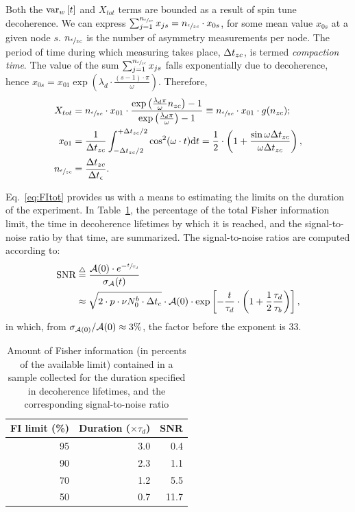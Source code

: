 \documentclass[a4paper]{jacow}
\newcommand{\td}{\mathrm{d}}
\newcommand{\cnt}{c}
\newcommand{\meas}{\epsilon}
\newcommand{\dt}{\Delta t}
\newcommand{\dtm}{\dt_{\meas}}
\newcommand{\dtc}{\dt_{\cnt}}
\newcommand{\Nmnd}{{n_{\sfrac{\meas}{zc}}}}
\newcommand{\Nnd}{{n_{zc}}}
\newcommand{\LTb}{\tau_b}
\newcommand{\LTd}{\tau_d}
\newcommand{\lamd}{\lambda_d}
\begin{document}
Both the $\var[w]{t}$ and $X_{tot}$ terms are bounded as a result of spin tune decoherence. We can express $\sum_{j=1}^{\Nmnd} x_{js} = \Nmnd \cdot x_{0s}$, for some mean value $x_{0s}$ at a given node $s$. $\Nmnd$ is the number of asymmetry measurements per node. The period of time during which measuring takes place, $\dtnd$, is termed \textit{compaction time}. The value of the sum $\sum_{j=1}^{\Nmnd} x_{js}$ falls exponentially due to decoherence, hence $x_{0s} = x_{01}\exp{(\lamd\cdot \frac{(s-1)\cdot\pi}{\omega})}$. Therefore,
\begin{align}
	X_{tot} & = \Nmnd\cdot x_{01} \cdot \frac{\exp{\bkt{\frac{\lamd\pi}{\omega}\Nnd}}-1}{\exp{\bkt{\frac{\lamd\pi}{\omega}}}-1} 
	\equiv \Nmnd \cdot x_{01}\cdot g(\Nnd); \label{eq:FItot}\\
	x_{01}  & = \frac{1}{\dtnd}\int_{-\dtnd/2}^{+\dtnd/2}\cos^2(\omega\cdot t)\td t = \frac12\cdot \bkt{1 + \frac{\sin\omega\dtnd}{\omega\dtnd}},                                    \label{eq:MeanFIZC}   \\
	\Nmnd   & = \frac{\dtnd}{\dtm}. \label{eq:NumMeasNode}
\end{align}

Eq.~\eqref{eq:FItot} provides us with a means to estimating the limits on the duration of the experiment. In Table~\ref{tbl:FItot}, the percentage of the total Fisher information limit, the time in decoherence lifetimes by which it is reached, and the signal-to-noise ratio by that time, are summarized. The signal-to-noise ratios are computed according to:
\begin{align}
\SNR &\deq \frac{\Asym(0)\cdot e^{-\sfrac{t}{\LTd}}}{\SD{\Asym}(t)} \notag\\
	 &\approx \sqrt{2\cdot p\cdot\nu N_0^b\cdot \dtc}\cdot \Asym(0)\cdot \exp\bkt*{-\frac{t}{\LTd}\cdot\bkt{1+\frac12\frac{\LTd}{\LTb}}},\label{eq:TauRatioSNR}
\end{align}
in which, from $\SD{\Asym(0)}/\Asym(0) \approx 3\%$, the factor before the exponent is 33.

\begin{table}[h]
	\caption{Amount of Fisher information (in percents of the available limit) contained in a sample collected for the duration specified in decoherence lifetimes, and the corresponding signal-to-noise ratio\label{tbl:FItot}}
	
	\centering
	\begin{tabular}{rrr}
		\hline
		FI limit (\%) & Duration ($\times\LTd$) & SNR  \\
		\hline
		95            & 3.0                     & 0.4         \\
		90            & 2.3                     & 1.1         \\
		70            & 1.2                     & 5.5         \\
		50            & 0.7                     & 11.7        \\
		\hline
	\end{tabular}
\end{table}
\end{document}
